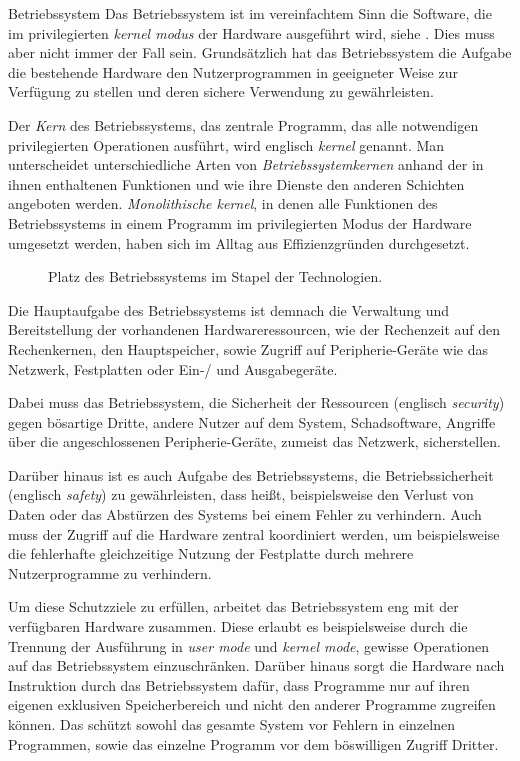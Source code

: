 \documentclass[12pt, a4paper]{article}
\begin{document}
\begin{defbox}{Betriebssystem}
Das Betriebssystem ist im vereinfachtem Sinn die Software, die im privilegierten \textit{kernel modus} der Hardware ausgeführt wird, siehe .
Dies muss aber nicht immer der Fall sein.
Grundsätzlich hat das Betriebssystem die Aufgabe die bestehende Hardware den Nutzerprogrammen in geeigneter Weise zur Verfügung zu stellen und deren sichere Verwendung zu gewährleisten.
\end{defbox}

Der \emph{Kern} des Betriebssystems, das zentrale Programm, das alle notwendigen privilegierten Operationen ausführt, wird englisch \emph{kernel} genannt.
Man unterscheidet unterschiedliche Arten von \emph{Betriebssystemkernen} anhand der in ihnen enthaltenen Funktionen und wie ihre Dienste den anderen Schichten angeboten werden.
\emph{Monolithische kernel}, in denen alle Funktionen des Betriebssystems in einem Programm im privilegierten Modus der Hardware umgesetzt werden, haben sich im Alltag aus Effizienzgründen durchgesetzt.

\begin{wrapfigure}{r}{8.7cm}

\caption{Platz des Betriebssystems im Stapel der Technologien.}
\label{fig:stack}
\end{wrapfigure}

Die Hauptaufgabe des Betriebssystems ist demnach die Verwaltung und Bereitstellung der vorhandenen Hardwareressourcen, wie der Rechenzeit auf den Rechenkernen, den Hauptspeicher, sowie Zugriff auf Peripherie-Geräte wie das Netzwerk, Festplatten oder Ein-/ und Ausgabegeräte.

\label{sec:security_safety}
Dabei muss das Betriebssystem, die Sicherheit der Ressourcen (englisch \emph{security}) gegen bösartige Dritte, andere Nutzer auf dem System, Schadsoftware, Angriffe über die angeschlossenen Peripherie-Geräte, zumeist das Netzwerk, sicherstellen.

Darüber hinaus ist es auch Aufgabe des Betriebssystems, die Betriebssicherheit (englisch \emph{safety}) zu gewährleisten, dass heißt, beispielsweise den Verlust von Daten oder das Abstürzen des Systems bei einem Fehler zu verhindern.
Auch muss der Zugriff auf die Hardware zentral koordiniert werden, um beispielsweise die fehlerhafte gleichzeitige Nutzung der Festplatte durch mehrere Nutzerprogramme zu verhindern.

Um diese Schutzziele zu erfüllen, arbeitet das Betriebssystem eng mit der verfügbaren Hardware zusammen.
Diese erlaubt es beispielsweise durch die Trennung der Ausführung in \textit{user mode} und \textit{kernel mode}, gewisse Operationen auf das Betriebssystem einzuschränken.
Darüber hinaus sorgt die Hardware nach Instruktion durch das Betriebssystem dafür, dass Programme nur auf ihren eigenen exklusiven Speicherbereich und nicht den anderer Programme zugreifen können.
Das schützt sowohl das gesamte System vor Fehlern in einzelnen Programmen, sowie das einzelne Programm vor dem böswilligen Zugriff Dritter.
\end{document}
